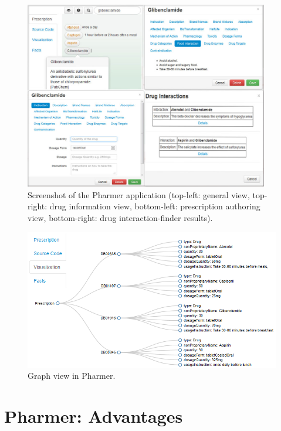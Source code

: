 \documentclass[conference]{IEEEtran}
\begin{document}
\begin{figure}[tb]
	\centering
		\includegraphics[width=0.95\textwidth]{images/screenshot1.jpg}
	\caption{Screenshot of the Pharmer application (top-left: general view, top-right: drug information view, bottom-left: prescription authoring view, bottom-right: drug interaction-finder results).}
	\label{fig:screenshot}
\end{figure}

\begin{figure}[tb]
	\centering
		\includegraphics[width=1\columnwidth]{images/sc2.png}
	\caption{Graph view in Pharmer.}
	\label{fig:graphview}
\end{figure}

\section{Pharmer: Advantages}
\label{sec:benefits}
\end{document}

